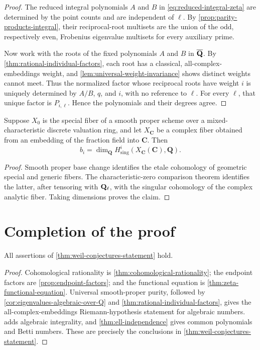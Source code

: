 \begin{proof}
The reduced integral polynomials \(A\) and \(B\) in
\eqref{eq:reduced-integral-zeta} are determined by the point counts and
are independent of \(\ell\).  By
\cref{prop:parity-products-integral}, their reciprocal-root multisets are
the union of the odd, respectively even, Frobenius eigenvalue multisets
for every auxiliary prime.

Now work with the roots of the fixed polynomials \(A\) and \(B\) in
\(\overline{\mathbf Q}\).  By \cref{thm:rational-individual-factors}, each root has a
classical, all-complex-embeddings weight, and
\cref{lem:universal-weight-invariance} shows distinct weights cannot
meet.  Thus the normalized factor whose reciprocal roots have weight
\(i\) is uniquely determined by \(A/B\), \(q\), and \(i\), with no
reference to \(\ell\).  For every \(\ell\), that unique factor is
\(P_{i,\ell}\).  Hence the polynomials and their degrees agree.
\end{proof}

\begin{corollary}
\label{cor:betti-comparison-lift}
Suppose \(X_0\) is the special fiber of a smooth proper scheme over a
mixed-characteristic discrete valuation ring, and let
\(X_{\mathbf C}\) be a complex fiber obtained from an embedding of the
fraction field into \(\mathbf C\).  Then
\[
 b_i=\dim_{\mathbf Q}H^i_{\mathrm{sing}}
       (X_{\mathbf C}(\mathbf C),\mathbf Q).
\]
\end{corollary}

\begin{proof}
Smooth proper base change identifies the etale cohomology of geometric
special and generic fibers.  The characteristic-zero comparison theorem
identifies the latter, after tensoring with \(\mathbf Q_\ell\), with the singular
cohomology of the complex analytic fiber.  Taking dimensions proves the
claim.
\end{proof}

\section{Completion of the proof}

\begin{theorem}
\label{thm:weil-conjectures-proved}
All assertions of \cref{thm:weil-conjectures-statement} hold.
\end{theorem}

\begin{proof}
Cohomological rationality is
\cref{thm:cohomological-rationality}; the endpoint factors are
\cref{prop:endpoint-factors}; and the functional equation is
\cref{thm:zeta-functional-equation}.  Universal smooth-proper purity,
followed by \cref{cor:eigenvalues-algebraic-over-Q} and
\cref{thm:rational-individual-factors}, gives the all-complex-embeddings
Riemann-hypothesis statement for algebraic numbers.
 adds algebraic integrality, and
\cref{thm:ell-independence} gives common polynomials and Betti numbers.
These are precisely the conclusions in
\cref{thm:weil-conjectures-statement}.
\end{proof}

